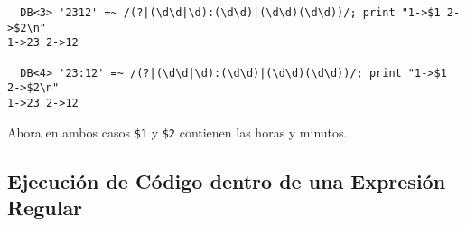 \begin{verbatim}
  DB<3> '2312' =~ /(?|(\d\d|\d):(\d\d)|(\d\d)(\d\d))/; print "1->$1 2->$2\n"
1->23 2->12

  DB<4> '23:12' =~ /(?|(\d\d|\d):(\d\d)|(\d\d)(\d\d))/; print "1->$1 2->$2\n"
1->23 2->12
\end{verbatim}
Ahora en ambos casos \verb|$1| y \verb|$2| contienen las horas y minutos.

%
%
%
%
%
%


\subsection{Ejecución de Código dentro de una Expresión Regular}
\label{subsection:codigoenregexp}

